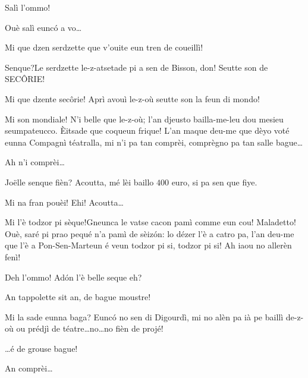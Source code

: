 \begin{drama}
\Dallasspeaks Salì l'ommo!

\Pompiolenspeaks Ouè salì eunc\'o a vo\ldots

\Dallasspeaks Mi que dzen serdzette que v'ouite eun tren de coueillì!


\Pompiolenspeaks{} Senque?Le serdzette le-z-atsetade pi a sen de Bisson, don! Seutte son de SEC\^ORIE!


\Joellespeaks  Mi que dzente sec\^orie! Aprì avouì le-z-où seutte son la feun di mondo! 

\Pompiolenspeaks Mi son mondiale! N’i belle que le-z-où; l'an djeusto bailla-me-leu dou mesieu seumpateucco. \`Eitsade que coqueun frique!   L'an maque deu-me que dèyo voté eunna Compagnì téatralla, mi n'i pa tan comprèi, comprègno pa tan salle bague\ldots

\Joellespeaks{} Ah n'i comprèi\ldots


\Dallasspeaks Jo\"{e}lle senque fièn? Acoutta, mé lèi baillo $400$ euro, si pa sen que fiye.

\Joellespeaks Mi na fran pouèi! Ehi!  Acoutta\ldots

\Pompiolenspeaks Mi l'è todzor pi sèque!Gneunca le vatse cacon pamì comme eun cou! Maladetto! Ouè, saré pi prao pequé n'a pamì de sèiz\'on: lo dézer l'è a catro pa, l'an deu-me que l'è a Pon-Sen-Marteun é veun todzor pi si, todzor pi si! Ah iaou no allerèn fenì!


\Dallasspeaks Deh l'ommo! Ad\'on l'è belle seque eh?

\Pompiolenspeaks An tappolette sit an, de bague moustre!

\Dallasspeaks Mi la sade eunna baga? Eunc\'o no sen di Digourdì, mi no alèn pa ià pe baillì de-z-où ou prédjì de téatre\ldots no\ldots no fièn de projé!

\Joellespeaks \ldots é de grouse bague!

\Pompiolenspeaks An comprèi\ldots


\end{drama}

